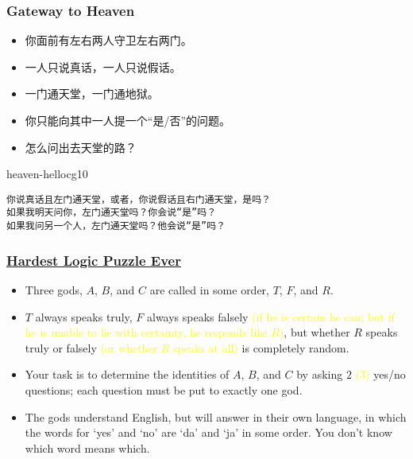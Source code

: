 \documentclass[UTF8,aspectratio=43,11pt,colorlinks,compress,openany]{beamer}%
\begin{document}
\begin{frame}[fragile]\frametitle{Gateway to Heaven}
	\begin{problem}
		\begin{itemize}
			\item 你面前有左右两人守卫左右两门。
			\item 一人只说真话，一人只说假话。
			\item 一门通天堂，一门通地狱。
			\item 你只能向其中一人提一个“是/否”的问题。
			\item 怎么问出去天堂的路？
		\end{itemize}
	\end{problem}
\begin{ocg}{heaven-hell}{ocg1}{0}
\begin{verbatim}
你说真话且左门通天堂，或者，你说假话且右门通天堂，是吗？
如果我明天问你，左门通天堂吗？你会说“是”吗？
如果我问另一个人，左门通天堂吗？他会说“是”吗？
\end{verbatim}
\end{ocg}
\end{frame}

\begin{frame}\frametitle{\href{https://mp.weixin.qq.com/s/CEtNyU3OMChVg5vMX5fnLA}{Hardest Logic Puzzle Ever}}
	\begin{problem}
		\begin{itemize}
			\item Three gods, $A$, $B$, and $C$ are called in some order, $T$, $F$, and $R$.
			\item $T$ always speaks truly, $F$ always speaks falsely \textcolor{yellow}{(if he is certain he can; but if he is unable to lie with certainty, he responds like $R$)}, but whether $R$ speaks truly or falsely \textcolor{yellow}{(or whether $R$ speaks at all)} is completely random.
			\item Your task is to determine the identities of $A$, $B$, and $C$ by asking $2$ \textcolor{yellow}{($3$)} yes/no questions; each question must be put to exactly one god.
			\item The gods understand English, but will answer in their own language, in which the words for `yes' and `no' are `da' and `ja' in some order. You don't know which word means which.
		\end{itemize}
	\end{problem}
\end{frame}
\end{document}
